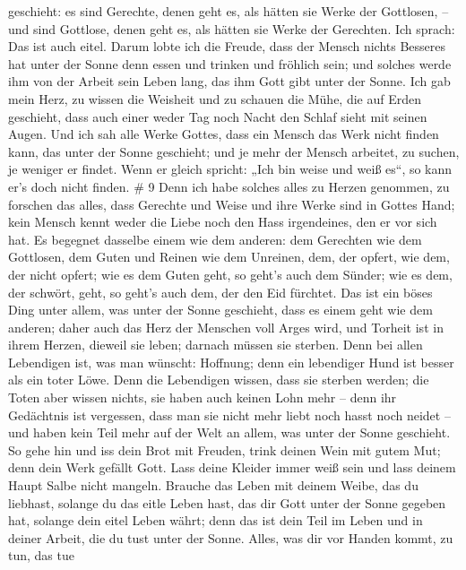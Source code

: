 geschieht: es sind Gerechte, denen geht es, als hätten sie Werke der
Gottlosen, -- und sind Gottlose, denen geht es, als hätten sie Werke der
Gerechten. Ich sprach: Das ist auch eitel.  Darum lobte ich
die Freude, dass der Mensch nichts Besseres hat unter der Sonne denn
essen und trinken und fröhlich sein; und solches werde ihm von der
Arbeit sein Leben lang, das ihm Gott gibt unter der Sonne. 
Ich gab mein Herz, zu wissen die Weisheit und zu schauen die Mühe, die
auf Erden geschieht, dass auch einer weder Tag noch Nacht den Schlaf
sieht mit seinen Augen.  Und ich sah alle Werke Gottes,
dass ein Mensch das Werk nicht finden kann, das unter der Sonne
geschieht; und je mehr der Mensch arbeitet, zu suchen, je weniger er
findet. Wenn er gleich spricht: „Ich bin weise und weiß es``, so kann
er's doch nicht finden. \# 9  Denn ich habe solches alles zu
Herzen genommen, zu forschen das alles, dass Gerechte und Weise und ihre
Werke sind in Gottes Hand; kein Mensch kennt weder die Liebe noch den
Hass irgendeines, den er vor sich hat.  Es begegnet dasselbe
einem wie dem anderen: dem Gerechten wie dem Gottlosen, dem Guten und
Reinen wie dem Unreinen, dem, der opfert, wie dem, der nicht opfert; wie
es dem Guten geht, so geht's auch dem Sünder; wie es dem, der schwört,
geht, so geht's auch dem, der den Eid fürchtet.  Das ist ein
böses Ding unter allem, was unter der Sonne geschieht, dass es einem
geht wie dem anderen; daher auch das Herz der Menschen voll Arges wird,
und Torheit ist in ihrem Herzen, dieweil sie leben; darnach müssen sie
sterben.  Denn bei allen Lebendigen ist, was man wünscht:
Hoffnung; denn ein lebendiger Hund ist besser als ein toter Löwe.
 Denn die Lebendigen wissen, dass sie sterben werden; die
Toten aber wissen nichts, sie haben auch keinen Lohn mehr -- denn ihr
Gedächtnis ist vergessen,  dass man sie nicht mehr liebt
noch hasst noch neidet -- und haben kein Teil mehr auf der Welt an
allem, was unter der Sonne geschieht.  So gehe hin und iss
dein Brot mit Freuden, trink deinen Wein mit gutem Mut; denn dein Werk
gefällt Gott.  Lass deine Kleider immer weiß sein und lass
deinem Haupt Salbe nicht mangeln.  Brauche das Leben mit
deinem Weibe, das du liebhast, solange du das eitle Leben hast, das dir
Gott unter der Sonne gegeben hat, solange dein eitel Leben währt; denn
das ist dein Teil im Leben und in deiner Arbeit, die du tust unter der
Sonne.  Alles, was dir vor Handen kommt, zu tun, das tue
